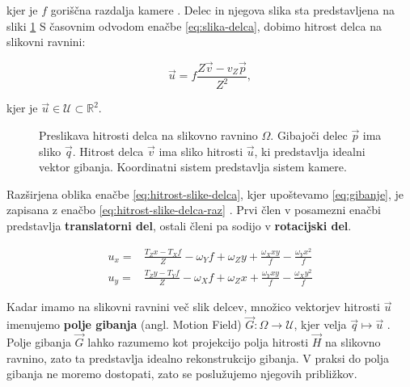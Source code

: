 kjer je $f$ goriščna razdalja kamere \cite{trucco1998introductory}. Delec in njegova slika sta predstavljena na sliki \ref{fig:optical-flow} S časovnim odvodom enačbe \eqref{eq:slika-delca}, dobimo hitrost delca na slikovni ravnini:

\begin{equation}\label{eq:hitrost-slike-delca}
	\vec{u} = f \frac{Z\vec{v}-v_Z\vec{p}}{Z^2},
\end{equation}

kjer je $\vec{u} \in \mathcal{U} \subset \mathbb{R}^2$.




\begin{figure}
\centering

\caption[Preslikava hitrosti delca na slikovno ravnino $\mathit{\Omega}$]{ Preslikava hitrosti delca na slikovno ravnino $\mathit{\Omega}$. Gibajoči delec $\vec{p}$ ima sliko $\vec{q}$. Hitrost delca $\vec{v}$ ima sliko hitrosti $\vec{u}$, ki predstavlja idealni vektor gibanja. Koordinatni sistem predstavlja sistem kamere.}
\label{fig:optical-flow}
\end{figure}




Razširjena oblika enačbe \eqref{eq:hitrost-slike-delca}, kjer upoštevamo \eqref{eq:gibanje}, je zapisana z enačbo \eqref{eq:hitrost-slike-delca-raz} \cite{trucco1998introductory}. Prvi člen v posamezni enačbi predstavlja \textbf{translatorni del}, ostali členi pa sodijo v \textbf{rotacijski del}.

\begin{equation}\label{eq:hitrost-slike-delca-raz}
\begin{aligned}
	u_x = & \frac{T_Z x - T_X f}{Z} - \omega_Y f + \omega_Z y + \frac{\omega_X x y}{f} - \frac{\omega_Y x^2}{f} \\
    u_y = & \frac{T_Z y - T_Y f}{Z} - \omega_X f + \omega_Z x + \frac{\omega_Y x y}{f} - \frac{\omega_X y^2}{f}
\end{aligned}
\end{equation}

Kadar imamo na slikovni ravnini več slik delcev, množico vektorjev hitrosti $\vec{u}$ imenujemo \textbf{polje gibanja} (angl. Motion Field) $\vec{G} : \mathit{\Omega} \to \mathcal{U}$, kjer velja $ \vec{q} \mapsto \vec{u}$ \cite{trucco1998introductory}. Polje gibanja $\vec{G}$ lahko razumemo kot projekcijo polja hitrosti $\vec{H}$ na slikovno ravnino, zato ta predstavlja idealno rekonstrukcijo gibanja. V praksi do polja gibanja ne moremo dostopati, zato se poslužujemo njegovih približkov.  

